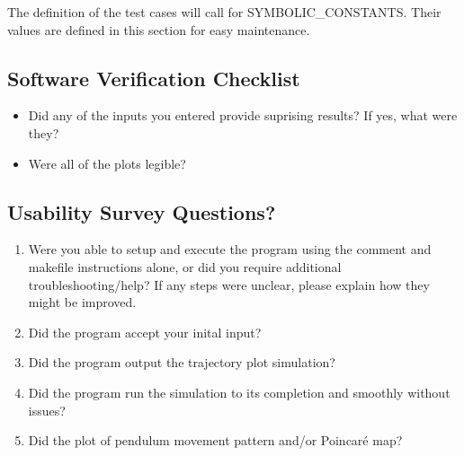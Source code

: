 \documentclass[12pt, titlepage]{article}
\begin{document}
The definition of the test cases will call for SYMBOLIC\_CONSTANTS.
Their values are defined in this section for easy maintenance.

\subsection{Software Verification Checklist} 
\label{softwarevercheck}
\begin{itemize}
	\item Did any of the inputs you entered provide suprising results? If yes, 
	what were they?
	\item Were all of the plots legible? 
\end{itemize} 

\subsection{Usability Survey Questions?}
\begin{enumerate}
	\item Were you able to setup and execute the program using the comment
	and makefile instructions alone, or did you require additional troubleshooting/help? 
	If any steps were unclear, please explain how they might be improved.
	\item Did the program accept your inital input?
	\item Did the program output the trajectory plot simulation?
	\item Did the program run the simulation to its completion and smoothly without issues?
	\item Did the plot of pendulum movement pattern and/or Poincar\'{e} map?
\end{enumerate}
\end{document}
